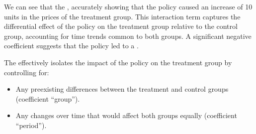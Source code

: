 \documentclass[letterpaper,10pt,english]{jupyterBook}
\begin{document}
\sphinxAtStartPar
We can see that the , accurately showing that the policy caused an increase of 10 units in the prices of the treatment group. This interaction term captures the differential effect of the policy on the treatment group relative to the control group, accounting for time trends common to both groups. A significant negative coefficient suggests that the policy led to a .

\sphinxAtStartPar
The  effectively isolates the impact of the policy on the treatment group by controlling for:
\begin{itemize}
\item {} 
\sphinxAtStartPar
Any pre\sphinxhyphen{}existing differences between the treatment and control groups (coefficient “group”).

\item {} 
\sphinxAtStartPar
Any changes over time that would affect both groups equally (coefficient “period”).

\end{itemize}

\sphinxstepscope
\end{document}
